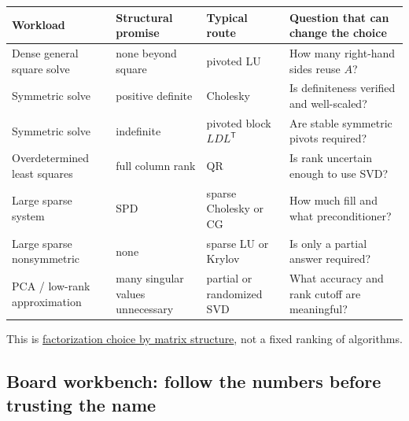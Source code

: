{\def\LTcaptype{none} %
\begin{longtable}[]{@{}
  >{\raggedright\arraybackslash}p{}
  >{\raggedright\arraybackslash}p{}
  >{\raggedright\arraybackslash}p{}
  >{\raggedright\arraybackslash}p{}@{}}
\toprule\noalign{}
\begin{minipage}[b]{\linewidth}\raggedright
Workload
\end{minipage} & \begin{minipage}[b]{\linewidth}\raggedright
Structural promise
\end{minipage} & \begin{minipage}[b]{\linewidth}\raggedright
Typical route
\end{minipage} & \begin{minipage}[b]{\linewidth}\raggedright
Question that can change the choice
\end{minipage} \\
\midrule\noalign{}
\endhead
\bottomrule\noalign{}
\endlastfoot
Dense general square solve & none beyond square & pivoted LU & How many right-hand sides reuse \(A\)? \\
Symmetric solve & positive definite & Cholesky & Is definiteness verified and well-scaled? \\
Symmetric solve & indefinite & pivoted block \(LDL^\mathsf T\) & Are stable symmetric pivots required? \\
Overdetermined least squares & full column rank & QR & Is rank uncertain enough to use SVD? \\
Large sparse system & SPD & sparse Cholesky or CG & How much fill and what preconditioner? \\
Large sparse nonsymmetric & none & sparse LU or Krylov & Is only a partial answer required? \\
PCA / low-rank approximation & many singular values unnecessary & partial or randomized SVD & What accuracy and rank cutoff are meaningful? \\
\end{longtable}
}

This is \hyperref[02-foundations-ii-ch038]{factorization choice by matrix structure}, not a fixed ranking of algorithms.

\subsection{Board workbench: follow the numbers before trusting the name}\label{board-workbench-follow-the-numbers-before-trusting-the-name}

